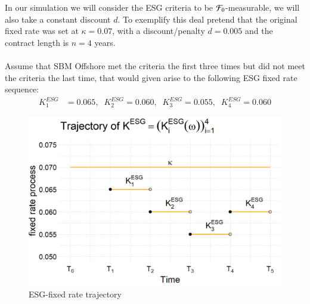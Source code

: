 In our simulation we will consider the ESG criteria to be $\mathcal{F}_{0}$-measurable, we will also take a constant discount $d$. To exemplify this deal pretend that the original fixed rate was set at $\kappa = 0.07$, with a discount/penalty $d = 0.005$ and the contract length is $n=4$ years. 
\\~\\
Assume that SBM Offshore met the criteria the first three times but did not meet the criteria the last time, that would given arise to the following ESG fixed rate sequence: 
\begin{align*}
K_{1}^{ESG} &=  0.065, \;\; 
K_{2}^{ESG} =   0.060, \;\;
K_{3}^{ESG} =   0.055, \;\; 
K_{4}^{ESG} =   0.060
\end{align*}


\begin{figure}[htp]
    \centering
    \includegraphics[width=12cm]{figures/ESG/SBM_ESG_path.png}
    \caption{ESG-fixed rate trajectory}
    \label{fig: SBM_ESG_path}
\end{figure}














\newpage 


